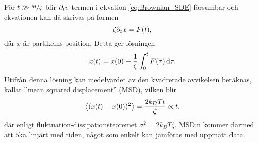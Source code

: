 För $t \gg \nicefrac{M}{\zeta}$ blir $\partial_t v$-termen i ekvation \eqref{eq:Brownian_SDE}  försumbar och ekvationen kan då skrivas på formen
\begin{equation}
    \zeta \partial_t x=F(t),
\end{equation}
där $x$ är partikelns position. Detta ger lösningen
\begin{equation}
    x(t)=x(0)+\frac{1}{\zeta} \int^t_0 F(\tau)\,\mathrm{d}\tau.
\end{equation}
Utifrån denna lösning kan medelvärdet av den kvadrerade avvikelsen beräknas, kallat ''mean squared displacement'' (MSD), vilken blir 
\begin{equation}\label{eq:MSD_brown}
    \ev{(x(t)-x(0))^2}=\frac{2k_BTt}{\zeta} \propto t,
\end{equation}
där enligt fluktuation-dissipationsteoremet  $\sigma^2=2k_BT\zeta$. MSD:n kommer därmed att öka linjärt med tiden, något som enkelt kan jämföras med uppmätt data.




